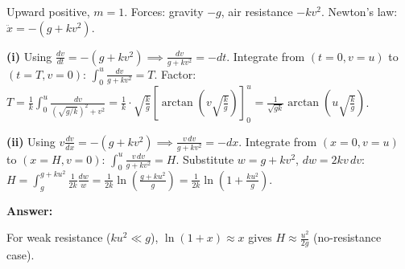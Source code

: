 \begin{solution}
Upward positive, $m=1$. Forces: gravity $-g$, air resistance $-kv^2$. Newton's law: $\ddot{x} = -(g + kv^2)$.

\begin{center}
\end{center}

\textbf{(i)} Using $\frac{dv}{dt} = -(g+kv^2) \implies \frac{dv}{g+kv^2} = -dt$. Integrate from $(t=0, v=u)$ to $(t=T, v=0)$: $\int_0^u \frac{dv}{g+kv^2} = T$. Factor: $T = \frac{1}{k}\int_0^u \frac{dv}{(\sqrt{g/k})^2 + v^2} = \frac{1}{k} \cdot \sqrt{\frac{k}{g}} \left[\arctan\left(v\sqrt{\frac{k}{g}}\right)\right]_0^u = \frac{1}{\sqrt{gk}}\arctan\left(u\sqrt{\frac{k}{g}}\right)$.

 \quad {}

\textbf{(ii)} Using $v\frac{dv}{dx} = -(g+kv^2) \implies \frac{v\,dv}{g+kv^2} = -dx$. Integrate from $(x=0, v=u)$ to $(x=H, v=0)$: $\int_0^u \frac{v\,dv}{g+kv^2} = H$. Substitute $w = g+kv^2$, $dw = 2kv\,dv$: $H = \int_g^{g+ku^2} \frac{1}{2k}\frac{dw}{w} = \frac{1}{2k}\ln\left(\frac{g+ku^2}{g}\right) = \frac{1}{2k}\ln\left(1+\frac{ku^2}{g}\right)$.

\textbf{Answer:} 

For weak resistance ($ku^2 \ll g$), $\ln(1+x) \approx x$ gives $H \approx \frac{u^2}{2g}$ (no-resistance case).
\end{solution}


